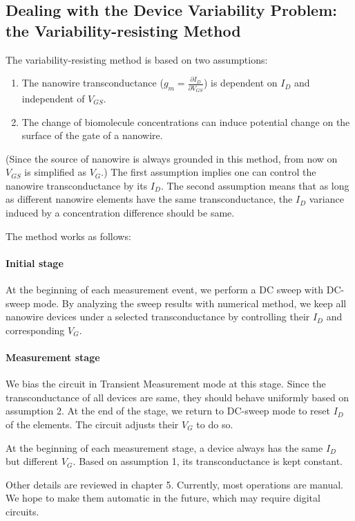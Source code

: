 \subsection*{Dealing with the Device Variability Problem: the Variability-resisting Method} \label{section:twqAssumption}
The variability-resisting method is based on two assumptions:
\begin{enumerate}
    \item The nanowire transconductance ($g_m = \frac{\partial I_D}{\partial V_{GS}}$) is dependent on $I_D$ and independent of $V_{GS}$.
    \item The change of biomolecule concentrations can induce potential change on the surface of the gate of a nanowire.
\end{enumerate}
(Since the source of nanowire is always grounded in this method, from now on $V_{GS}$ is simplified as $V_G$.)
The first assumption implies one can control the nanowire transconductance by its $I_D$.
The second assumption means that as long as different nanowire elements have the same transconductance, the $I_D$ variance induced by a concentration difference should be same.

The method works as follows:

\paragraph*{Initial stage}
At the beginning of each measurement event, we perform a DC sweep with DC-sweep mode.
By analyzing the sweep results with numerical method, we keep all nanowire devices under a selected transconductance by controlling their $I_D$ and corresponding $V_G$.


\paragraph*{Measurement stage}
We bias the circuit in Transient Measurement mode at this stage.
Since the transconductance of all devices are same, they should behave uniformly based on assumption 2.
At the end of the stage, we return to DC-sweep mode to reset $I_D$ of the elements.
The circuit adjusts their $V_G$ to do so.

At the beginning of each measurement stage, a device always has the same $I_D$ but different $V_G$.
Based on assumption 1, its transconductance is kept constant.

Other details are reviewed in chapter 5.
Currently, most operations are manual.
We hope to make them automatic in the future, which may require digital circuits.


